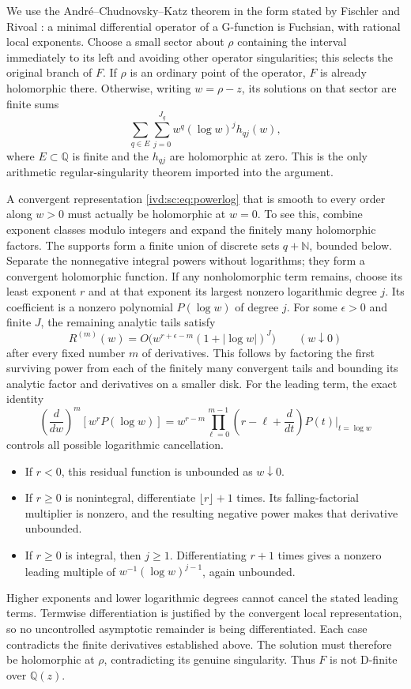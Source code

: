 \documentclass[11pt,letterpaper]{article}
\theoremstyle{remark}\newtheorem{remark}[theorem]{Remark}
\numberwithin{equation}{section}
\newcommand{\NN}{\mathbb N}\newcommand{\ZZ}{\mathbb Z}
\begin{document}
We use the Andr\'e--Chudnovsky--Katz theorem in the form stated by
Fischler and Rivoal \cite[Theorem 6, pp.\ 328--329]{FR}: a minimal
differential operator of a G-function is Fuchsian, with rational local
exponents. Choose a small sector about $\rho$ containing the interval immediately
to its left and avoiding other operator singularities; this selects the
original branch of $F$. If $\rho$ is an ordinary point of the operator,
$F$ is already holomorphic there. Otherwise, writing $w=\rho-z$,
its solutions on that sector are finite sums
\begin{equation}\label{ivd:sc:eq:powerlog}
 \sum_{q\in E}\sum_{j=0}^{J_q} w^q(\log w)^j h_{qj}(w),
\end{equation}
where $E\subset\mathbb Q$ is finite and the $h_{qj}$ are holomorphic
at zero. This is the only arithmetic regular-singularity theorem
imported into the argument.

A convergent representation \eqref{ivd:sc:eq:powerlog} that is smooth to every
order along $w>0$ must actually be holomorphic at $w=0$. To see this,
combine exponent classes modulo integers and expand the finitely many
holomorphic factors. The supports form a finite union of discrete sets
$q+\NN$, bounded below. Separate the nonnegative integral powers
without logarithms; they form a convergent holomorphic function. If any
nonholomorphic term remains, choose its least exponent $r$ and at that
exponent its largest nonzero logarithmic degree $j$. Its coefficient
is a nonzero polynomial $P(\log w)$ of degree $j$. For some
$\epsilon>0$ and finite $J$, the remaining analytic tails satisfy
\[
 R^{(m)}(w)=O\big(w^{r+\epsilon-m}(1+|\log w|)^J\big)
 \qquad(w\downarrow0)
\]
after every fixed number $m$ of derivatives. This follows by factoring
the first surviving power from each of the finitely many convergent
tails and bounding its analytic factor and derivatives on a smaller
disk. For the leading term, the exact identity
\[
 \left(\frac d{dw}\right)^m[w^rP(\log w)]
 =w^{r-m}\prod_{\ell=0}^{m-1}\left(r-\ell+\frac d{dt}\right)P(t)
 \bigg|_{t=\log w}
\]
controls all possible logarithmic cancellation.
\begin{itemize}
\item If $r<0$, this residual function is unbounded as $w\downarrow0$.
\item If $r\ge0$ is nonintegral, differentiate $\lfloor r\rfloor+1$
times. Its falling-factorial multiplier is nonzero, and the resulting
negative power makes that derivative unbounded.
\item If $r\ge0$ is integral, then $j\ge1$. Differentiating $r+1$
times gives a nonzero leading multiple of
$w^{-1}(\log w)^{j-1}$, again unbounded.
\end{itemize}
Higher exponents and lower logarithmic degrees cannot cancel the stated
leading terms. Termwise differentiation is justified by the convergent
local representation, so no uncontrolled asymptotic remainder is being
differentiated. Each case contradicts the finite derivatives established
above. The solution must therefore be holomorphic at $\rho$, contradicting
its genuine singularity. Thus $F$ is not D-finite over $\mathbb Q(z)$.
\end{document}
